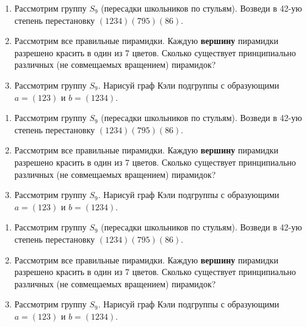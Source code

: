 \documentclass[12pt]{article} %
\begin{document}
\begin{enumerate}
\item Рассмотрим группу $S_{9}$ (пересадки школьников по стульям). Возведи в 42-ую степень перестановку $(1234)(795)(86)$.

\item Рассмотрим все правильные пирамидки. Каждую \textbf{вершину} пирамидки разрешено красить в один из 7 цветов. Сколько существует принципиально различных (не совмещаемых вращением) пирамидок?

\item Рассмотрим группу $S_9$. Нарисуй граф Кэли подгруппы с образующими $a=(123)$ и $b=(1234)$.

\end{enumerate}

\vspace{1cm}

\begin{enumerate}
\item Рассмотрим группу $S_{9}$ (пересадки школьников по стульям). Возведи в 42-ую степень перестановку $(1234)(795)(86)$.

\item Рассмотрим все правильные пирамидки. Каждую \textbf{вершину} пирамидки разрешено красить в один из 7 цветов. Сколько существует принципиально различных (не совмещаемых вращением) пирамидок?

\item Рассмотрим группу $S_9$. Нарисуй граф Кэли подгруппы с образующими $a=(123)$ и $b=(1234)$.

\end{enumerate}

\vspace{1cm}

\begin{enumerate}
\item Рассмотрим группу $S_{9}$ (пересадки школьников по стульям). Возведи в 42-ую степень перестановку $(1234)(795)(86)$.

\item Рассмотрим все правильные пирамидки. Каждую \textbf{вершину} пирамидки разрешено красить в один из 7 цветов. Сколько существует принципиально различных (не совмещаемых вращением) пирамидок?

\item Рассмотрим группу $S_9$. Нарисуй граф Кэли подгруппы с образующими $a=(123)$ и $b=(1234)$.

\end{enumerate}
\end{document}
